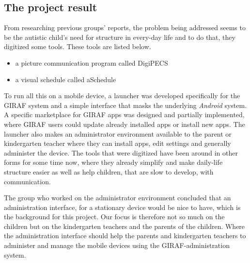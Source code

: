 \subsection{The project result}
From researching previous groups' reports, the problem being addressed seems to be the autistic child's need for structure in every-day life and to do that, they digitized some tools. These tools are listed below.
\begin{itemize}
	\item a picture communication program called DigiPECS
	\item a visual schedule called aSchedule
\end{itemize}

To run all this on a mobile device, a launcher was developed specifically for the GIRAF system and a simple interface that masks the underlying \textit{Android} system. A specific marketplace for GIRAF apps was designed and partially implemented, where GIRAF users could update already installed apps or install new apps. The launcher also makes an administrator environment available to the parent or kindergarten teacher where they can install apps, edit settings and generally administer the device.
The tools that were digitized have been around in other forms for some time now, where they already simplify and make daily-life structure easier as well as help children, that are slow to develop, with communication.

The group who worked on the administrator environment concluded that an administration interface, for a stationary device would be nice to have, which is the background for this project.
Our focus is therefore not so much on the children but on the kindergarten teachers and the parents of the children. Where the administration interface should help the parents and kindergarten teachers to administer and manage the mobile devices using the GIRAF-administration system.\cite{giraffactors}
